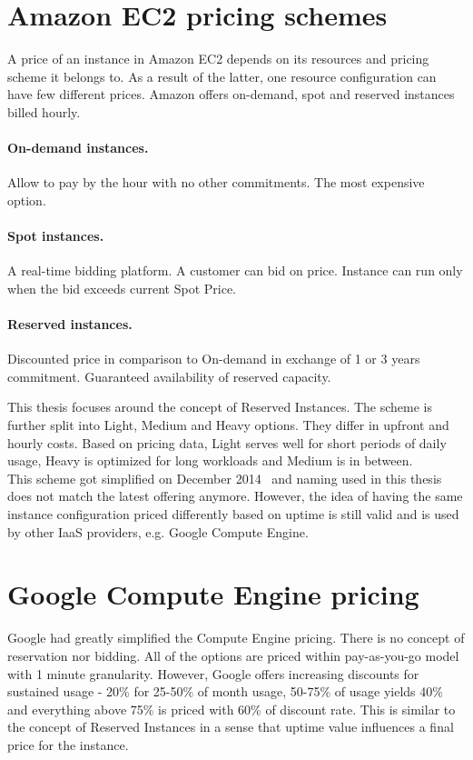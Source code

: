 \documentclass[]{final_report}
\begin{document}
\section{Amazon EC2 pricing schemes}

A price of an instance in Amazon EC2 depends on its resources and pricing scheme it belongs to. As a result of the latter, one resource configuration can have few different prices. Amazon offers on-demand, spot and reserved instances billed hourly.

\paragraph{On-demand instances.} Allow to pay by the hour with no other commitments. The most expensive option.
\paragraph{Spot instances.} A real-time bidding platform. A customer can bid on price. Instance can run only when the bid exceeds current Spot Price.
\paragraph{Reserved instances.} Discounted price in comparison to On-demand in exchange of 1 or 3 years commitment. Guaranteed availability of reserved capacity. 

This thesis focuses around the concept of Reserved Instances. The scheme is further split into Light, Medium and Heavy options. They differ in upfront and hourly costs. Based on pricing data, Light serves well for short periods of daily usage, Heavy is optimized for long workloads and Medium is in between. \\
This scheme got simplified on December 2014~\cite{AWS:pricing_change} and naming used in this thesis does not match the latest offering anymore. However, the idea of having the same instance configuration priced differently based on uptime is still valid and is used by other IaaS providers, e.g. Google Compute Engine.

\section{Google Compute Engine pricing}

Google had greatly simplified the Compute Engine pricing. There is no concept of reservation nor bidding. All of the options are priced within pay-as-you-go model with 1 minute granularity. However, Google offers increasing discounts for sustained usage - 20\% for 25-50\% of month usage, 50-75\% of usage yields 40\% and everything above 75\% is priced with 60\% of discount rate. This is similar to the concept of Reserved Instances in a sense that uptime value influences a final price for the instance.
\end{document}
